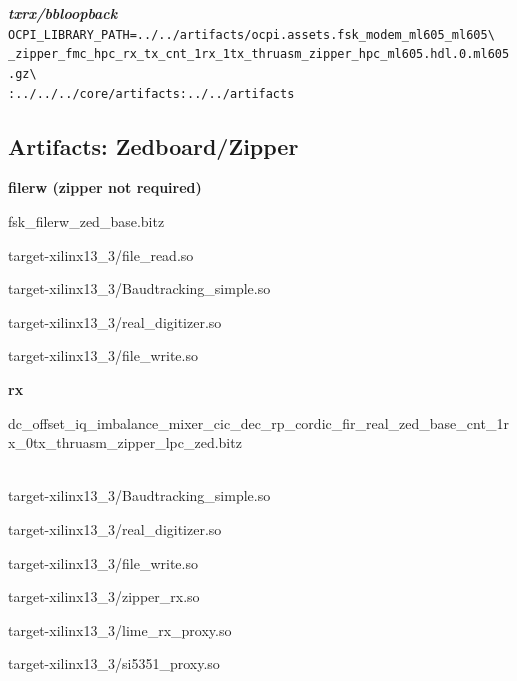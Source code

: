 \begin{appendices}
\textbf{\textit{txrx/bbloopback}}\\
\verb|OCPI_LIBRARY_PATH=../../artifacts/ocpi.assets.fsk_modem_ml605_ml605\| \\
\verb|_zipper_fmc_hpc_rx_tx_cnt_1rx_1tx_thruasm_zipper_hpc_ml605.hdl.0.ml605.gz\| \\
\verb|:../../../core/artifacts:../../artifacts| \\


\pagebreak

\subsection{Artifacts: Zedboard/Zipper}
	\textbf{filerw (zipper not required)}
	\begin{itemize}
	\begin{minipage}[t]{.5\textwidth}
	\item fsk\_filerw\_zed\_base.bitz
	\item target-xilinx13\_3/file\_read.so
	\item target-xilinx13\_3/Baudtracking\_simple.so
	\end{minipage}
	\begin{minipage}[t]{.5\textwidth}
	\item target-xilinx13\_3/real\_digitizer.so
	\item target-xilinx13\_3/file\_write.so
	\end{minipage}
	\end{itemize}

	\textbf{rx}
	\begin{itemize}
	\item dc\_offset\_iq\_imbalance\_mixer\_cic\_dec\_rp\_cordic\_fir\_real\_zed\_base\_cnt\_1rx\_0tx\_thruasm\_zipper\_lpc\_zed.bitz \\ \\
	\begin{minipage}[t]{.5\textwidth}
	\item target-xilinx13\_3/Baudtracking\_simple.so
	\item target-xilinx13\_3/real\_digitizer.so
	\item target-xilinx13\_3/file\_write.so
	\end{minipage}
	\begin{minipage}[t]{.5\textwidth}
	\item target-xilinx13\_3/zipper\_rx.so
	\item target-xilinx13\_3/lime\_rx\_proxy.so
	\item target-xilinx13\_3/si5351\_proxy.so
	\end{minipage}
	\end{itemize}


\end{appendices}
